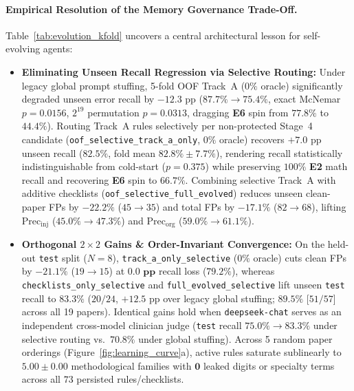 \documentclass[11pt,a4paper]{article}
\begin{document}
\paragraph{Empirical Resolution of the Memory Governance Trade-Off.}
Table~\ref{tab:evolution_kfold} uncovers a central architectural lesson for self-evolving agents:
\begin{itemize}[leftmargin=1.5em,itemsep=2pt]
  \item \textbf{Eliminating Unseen Recall Regression via Selective Routing:} Under legacy global prompt stuffing, 5-fold OOF Track~A ($0\%$ oracle) significantly degraded unseen error recall by $-12.3\text{ pp}$ ($87.7\% \to 75.4\%$, exact McNemar $p=0.0156$, $2^{19}$ permutation $p=0.0313$, dragging \textbf{E6} spin from $77.8\%$ to $44.4\%$). Routing Track~A rules selectively per non-protected Stage~4 candidate (\texttt{oof\_selective\_track\_a\_only}, $0\%$ oracle) recovers $+7.0\text{ pp}$ unseen recall ($\mathbf{82.5\%}$, fold mean $82.8\% \pm 7.7\%$), rendering recall statistically indistinguishable from cold-start ($p=0.375$) while preserving $100\%$ \textbf{E2} math recall and recovering \textbf{E6} spin to $66.7\%$. Combining selective Track~A with additive checklists (\texttt{oof\_selective\_full\_evolved}) reduces unseen clean-paper FPs by $\mathbf{-22.2\%}$ ($45 \to 35$) and total FPs by $-17.1\%$ ($82 \to 68$), lifting $\text{Prec}_{\text{inj}}$ ($45.0\% \to 47.3\%$) and $\text{Prec}_{\text{org}}$ ($59.0\% \to 61.1\%$).
  \item \textbf{Orthogonal $2\times 2$ Gains \& Order-Invariant Convergence:} On the held-out \texttt{test} split ($N=8$), \texttt{track\_\allowbreak a\_\allowbreak only\_\allowbreak selective} ($0\%$ oracle) cuts clean FPs by $-21.1\%$ ($19 \to 15$) at $\mathbf{0.0\text{ pp}}$ recall loss ($79.2\%$), whereas \texttt{checklists\_\allowbreak only\_\allowbreak selective} and \texttt{full\_\allowbreak evolved\_\allowbreak selective} lift unseen \texttt{test} recall to $\mathbf{83.3\%}$ ($20/24$, $+12.5\text{ pp}$ over legacy global stuffing; $89.5\%$ [$51/57$] across all 19 papers). Identical gains hold when \texttt{deepseek-chat} serves as an independent cross-model clinician judge (\texttt{test} recall $75.0\% \to \mathbf{83.3\%}$ under selective routing vs.\ $70.8\%$ under global stuffing). Across 5 random paper orderings (Figure~\ref{fig:learning_curve}a), active rules saturate sublinearly to $\mathbf{5.00 \pm 0.00}$ methodological families with $\mathbf{0}$ leaked digits or specialty terms across all $73$ persisted rules/checklists.
\end{itemize}
\end{document}
